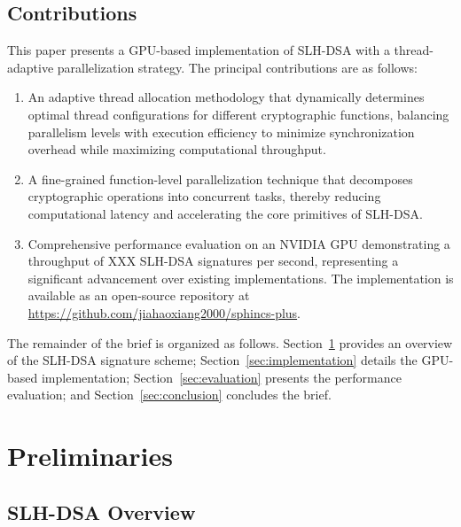 \documentclass[journal]{IEEEtran}
\begin{document}
\subsection{Contributions}


This paper presents a GPU-based implementation of SLH-DSA with a thread-adaptive parallelization strategy. The principal contributions are as follows:

\begin{enumerate}
  \item An adaptive thread allocation methodology that dynamically determines optimal thread configurations for different cryptographic functions, balancing parallelism levels with execution efficiency to minimize synchronization overhead while maximizing computational throughput.

  \item A fine-grained function-level parallelization technique that decomposes cryptographic operations into concurrent tasks, thereby reducing computational latency and accelerating the core primitives of SLH-DSA.

  \item Comprehensive performance evaluation on an NVIDIA GPU demonstrating a throughput of XXX SLH-DSA signatures per second, representing a significant advancement over existing implementations. The implementation is available as an open-source repository at \url{https://github.com/jiahaoxiang2000/sphincs-plus}.
\end{enumerate}

\color{black}

The remainder of the brief is organized as follows. Section~\ref{sec:preliminaries} provides an overview of the SLH-DSA signature scheme; Section~\ref{sec:implementation} details the GPU-based implementation; Section~\ref{sec:evaluation} presents the performance evaluation; and Section~\ref{sec:conclusion} concludes the brief.

\section{Preliminaries}\label{sec:preliminaries}

\subsection{SLH-DSA Overview}
\end{document}
